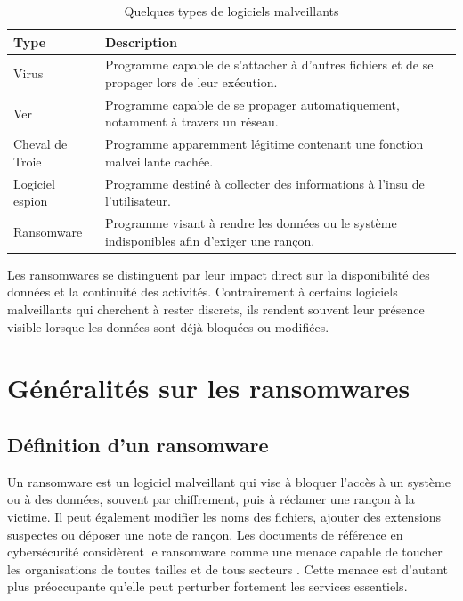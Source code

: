 \begin{table}[htbp]
\centering
\caption{Quelques types de logiciels malveillants}
\label{tab:types-malwares}
\small
\renewcommand{\arraystretch}{1.3}
\begin{tabularx}{\textwidth}{|p{3.5cm}|X|}
\hline
\textbf{Type} & \textbf{Description} \\
\hline
Virus & Programme capable de s'attacher à d'autres fichiers et de se propager lors de leur exécution. \\
\hline
Ver & Programme capable de se propager automatiquement, notamment à travers un réseau. \\
\hline
Cheval de Troie & Programme apparemment légitime contenant une fonction malveillante cachée. \\
\hline
Logiciel espion & Programme destiné à collecter des informations à l'insu de l'utilisateur. \\
\hline
Ransomware & Programme visant à rendre les données ou le système indisponibles afin d'exiger une rançon. \\
\hline
\end{tabularx}
\end{table}

\noindent Les ransomwares se distinguent par leur impact direct sur la disponibilité des données et la continuité des activités. Contrairement à certains logiciels malveillants qui cherchent à rester discrets, ils rendent souvent leur présence visible lorsque les données sont déjà bloquées ou modifiées.

\section{Généralités sur les ransomwares}

\subsection{Définition d'un ransomware}

Un \gls{ransomware} est un logiciel malveillant qui vise à bloquer l'accès à un système ou à des données, souvent par chiffrement, puis à réclamer une rançon à la victime. Il peut également modifier les noms des fichiers, ajouter des extensions suspectes ou déposer une note de rançon. Les documents de référence en cybersécurité considèrent le ransomware comme une menace capable de toucher les organisations de toutes tailles et de tous secteurs \cite{nistRansomwareProfile2025,oz2022survey}. Cette menace est d'autant plus préoccupante qu'elle peut perturber fortement les services essentiels.

